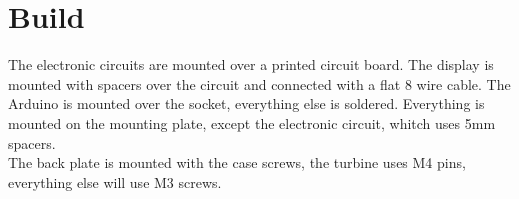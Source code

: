 \section{Build}
    The electronic circuits are mounted over a printed circuit board. The display is  mounted with spacers over the circuit and connected with a flat 8 wire cable. The Arduino is mounted over the socket, everything else is soldered. Everything is mounted on the mounting plate, except the electronic circuit, whitch uses 5mm spacers.\\
    
    The back plate is mounted with the case screws, the turbine uses M4 pins, everything else will use M3 screws. 
